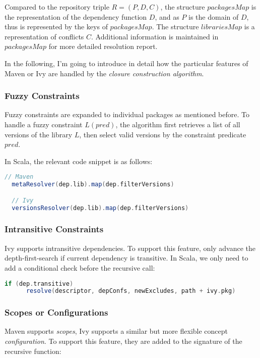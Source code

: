Compared to the repository triple $R = (P, D, C)$, the structure $packagesMap$ is the representation of the dependency function $D$, and as $P$ is the domain of $D$, thus is represented by the keys of $packagesMap$. The structure $librariesMap$ is a representation of conflicts $C$. Additional information is maintained in $packagesMap$ for more detailed resolution report.

In the following, I'm going to introduce in detail how the particular features of Maven or Ivy are handled by the \emph{closure construction algorithm}.

\subsubsection{Fuzzy Constraints}

Fuzzy constraints are expanded to individual packages as mentioned before. To handle a fuzzy constraint $L(pred)$, the algorithm first retrieves a list of all versions of the library $L$, then select valid versions by the constraint predicate $pred$.

In Scala, the relevant code snippet is as follows:

\begin{lstlisting}[language=Scala]
  // Maven
  metaResolver(dep.lib).map(dep.filterVersions)

  // Ivy
  versionsResolver(dep.lib).map(dep.filterVersions)
\end{lstlisting}

\subsubsection{Intransitive Constraints}

Ivy supports intransitive dependencies. To support this feature, only advance the depth-first-search if current dependency is transitive. In Scala, we only need to add a conditional check before the recursive call:

\begin{lstlisting}[language=Scala]
  if (dep.transitive)
      resolve(descriptor, depConfs, newExcludes, path + ivy.pkg)
\end{lstlisting}

\subsubsection{Scopes or Configurations}

Maven supports \emph{scopes}, Ivy supports a similar but more flexible concept \emph{configuration}. To support this feature, they are added to the signature of the recursive function:

